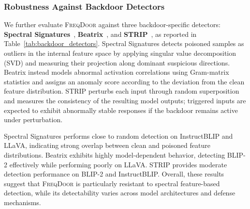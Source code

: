 \documentclass[lettersize,journal]{IEEEtran}
\begin{document}
\subsubsection{Robustness Against Backdoor Detectors}
We further evaluate \textsc{FreqDoor} against three backdoor-specific detectors:
\textbf{Spectral Signatures}~\cite{Tran2018Spectral}, \textbf{Beatrix}~\cite{Ma2023Beatrix}, and \textbf{STRIP}~\cite{Gao2019STRIP}, as reported in
Table~\ref{tab:backdoor_detectors}. Spectral Signatures detects poisoned samples
as outliers in the internal feature space by applying singular value decomposition
(SVD) and measuring their projection along dominant suspicious directions.
Beatrix instead models abnormal activation correlations using Gram-matrix
statistics and assigns an anomaly score according to the deviation from the clean
feature distribution. STRIP perturbs each input through random superposition and
measures the consistency of the resulting model outputs; triggered inputs are
expected to exhibit abnormally stable responses if the backdoor remains active
under perturbation.

Spectral Signatures performs close to random detection on InstructBLIP and LLaVA,
indicating strong overlap between clean and poisoned feature distributions.
Beatrix exhibits highly model-dependent behavior, detecting BLIP-2 effectively
while performing poorly on LLaVA. STRIP provides moderate detection performance
on BLIP-2 and InstructBLIP. Overall, these results suggest that \textsc{FreqDoor}
is particularly resistant to spectral feature-based detection, while its
detectability varies across model architectures and defense mechanisms.
\end{document}
